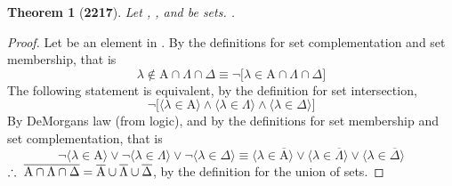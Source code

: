 \documentclass[preview]{standalone}
\newtheorem*{theorem*}{Theorem}
\begin{document}
\begin{theorem*}[\textbf{2217}] \color{black}
    Let , \bm{$\Lambda$}, and \bm{$\Delta$} be sets. 
    .
\end{theorem*}
\begin{proof} \color{black}
    Let \bm{$\lambda$} be an element in 
    . 
    By the definitions for set complementation and set membership, that is
    \begin{equation*}
        \lambda \notin \mathrm{A} \cap \Lambda \cap \Delta 
            \equiv 
        \lnot \big[ \lambda \in
            \mathrm{A} \cap \Lambda \cap \Delta
        \big]
    \end{equation*}
    The following statement is equivalent, by the definition for set intersection,
    \begin{equation*}
        \lnot \Big[
            \big \langle \lambda \in \mathrm{A} \big \rangle 
                \land 
            \big \langle \lambda \in \Lambda \big \rangle
                \land 
            \big \langle \lambda \in \Delta \big \rangle
        \Big]
    \end{equation*}
    By DeMorgans law (from logic), 
    and by the definitions for set membership and set complementation, that is 
    \begin{equation*}
        \lnot \Big \langle \lambda \in \mathrm{A} \Big \rangle 
            \lor 
        \lnot \Big \langle \lambda \in \Lambda \Big \rangle 
            \lor 
        \lnot \Big \langle \lambda \in \Delta \Big \rangle
            \equiv
        \Big \langle \lambda \in \overline{\mathrm{A}} \Big \rangle 
            \lor 
        \Big \langle \lambda \in \overline{\Lambda} \Big \rangle
            \lor 
        \Big \langle \lambda \in \overline{\Delta} \Big \rangle
    \end{equation*}
    $\therefore \text{\space} \relax{
    \overline{
            \mathrm{A} 
                \cap 
            \Lambda 
                \cap 
            \Delta
    } 
        = 
    \overline{\mathrm{A}} 
        \cup 
    \overline{\Lambda} 
        \cup 
    \overline {\Delta}}
    $,
    by the definition for the union of sets.
\color{lightgray} \end{proof}
\end{document}
